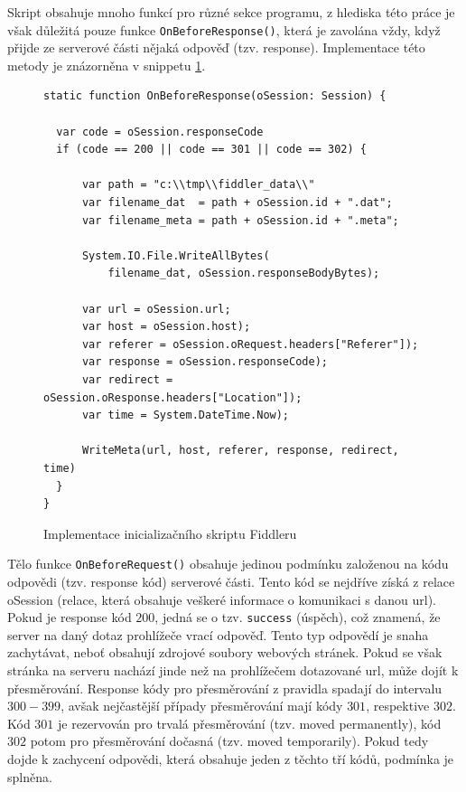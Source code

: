 \documentclass[thesis=M,czech,hidelinks]{FITthesis}[2013/05/06]
\begin{document}
Skript obsahuje mnoho funkcí pro různé sekce programu, z hlediska této práce je však důležitá pouze funkce \texttt{OnBeforeResponse()}, která je zavolána vždy, když přijde ze serverové části nějaká odpověď (tzv. response). Implementace této metody je znázorněna v snippetu \ref{snip:fiddler}.

\begin{figure}[h]               
	\begin{verbatim}
static function OnBeforeResponse(oSession: Session) {

  var code = oSession.responseCode
  if (code == 200 || code == 301 || code == 302) {

      var path = "c:\\tmp\\fiddler_data\\"
      var filename_dat  = path + oSession.id + ".dat";
      var filename_meta = path + oSession.id + ".meta";

      System.IO.File.WriteAllBytes(
          filename_dat, oSession.responseBodyBytes);
       
      var url = oSession.url;
      var host = oSession.host);
      var referer = oSession.oRequest.headers["Referer"]);
      var response = oSession.responseCode);
      var redirect = oSession.oResponse.headers["Location"]);
      var time = System.DateTime.Now);
      
      WriteMeta(url, host, referer, response, redirect, time)
  }
}
	\end{verbatim}      
	\caption{Implementace inicializačního skriptu Fiddleru}
	\label{snip:fiddler}
\end{figure}

Tělo funkce \texttt{OnBeforeRequest()} obsahuje jedinou podmínku založenou na kódu odpovědi (tzv. response kód) serverové části. Tento kód se nejdříve získá z relace oSession (relace, která obsahuje veškeré informace o komunikaci s danou url). Pokud je response kód $200$, jedná se o tzv. \texttt{success} (úspěch), což znamená, že server na daný dotaz prohlížeče vrací odpověď. Tento typ odpovědí je snaha zachytávat, neboť obsahují zdrojové soubory webových stránek. Pokud se však stránka na serveru nachází jinde než na prohlížečem dotazované url, může dojít k přesměrování. Response kódy pro přesměrování z pravidla spadají do intervalu $300-399$, avšak nejčastější případy přesměrování mají kódy $301$, respektive $302$. Kód $301$ je rezervován pro trvalá přesměrování (tzv. moved permanently), kód $302$ potom pro přesměrování dočasná (tzv. moved temporarily)\cite{response_codes}. Pokud tedy dojde k zachycení odpovědi, která obsahuje jeden z těchto tří kódů, podmínka je splněna.
\end{document}
